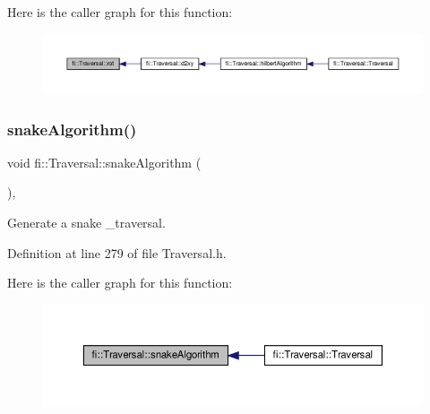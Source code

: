 Here is the caller graph for this function\+:
\nopagebreak
\begin{figure}[H]
\begin{center}
\leavevmode
\includegraphics[width=350pt]{d8/d0e/classfi_1_1Traversal_a438a10f5688a0ba0d42c7dbf5b4bf305_icgraph}
\end{center}
\end{figure}
\mbox{\label{classfi_1_1Traversal_a2382a65146511efc3c56d5db303e0b2d}} 
\subsubsection{\texorpdfstring{snake\+Algorithm()}{snakeAlgorithm()}}
{\footnotesize\ttfamily void fi\+::\+Traversal\+::snake\+Algorithm (\begin{DoxyParamCaption}{ }\end{DoxyParamCaption})\hspace{0.3cm}{\ttfamily [inline]}, {\ttfamily [private]}}



Generate a snake \+\_\+traversal. 



Definition at line 279 of file Traversal.\+h.

Here is the caller graph for this function\+:
\nopagebreak
\begin{figure}[H]
\begin{center}
\leavevmode
\includegraphics[width=350pt]{d8/d0e/classfi_1_1Traversal_a2382a65146511efc3c56d5db303e0b2d_icgraph}
\end{center}
\end{figure}
\mbox{\label{classfi_1_1Traversal_af932ac9b0af7fb02dee64fd544229597}} 
